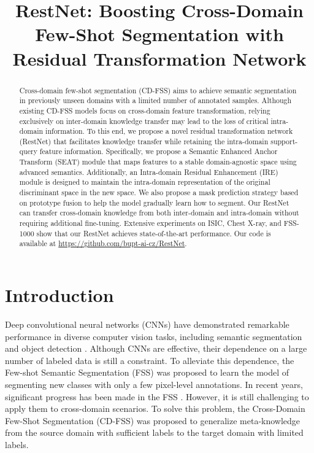 \documentclass{bmvc2k}
\title{RestNet: Boosting Cross-Domain Few-Shot Segmentation with Residual Transformation Network}
\begin{document}
\maketitle


\begin{abstract}
Cross-domain few-shot segmentation (CD-FSS) aims to achieve semantic segmentation in previously unseen domains with a limited number of annotated samples.
Although existing CD-FSS models focus on cross-domain feature transformation, relying exclusively on inter-domain knowledge transfer may lead to the loss of critical intra-domain information.
To this end, we propose a novel residual transformation network (RestNet) that facilitates knowledge transfer while retaining the intra-domain support-query feature information.
Specifically, we propose a Semantic Enhanced Anchor Transform (SEAT) module that maps features to a stable domain-agnostic space using advanced semantics. 
Additionally, an Intra-domain Residual Enhancement (IRE) module is designed to maintain the intra-domain representation of the original discriminant space in the new space.
We also propose a mask prediction strategy based on prototype fusion to help the model gradually learn how to segment.
Our RestNet can transfer cross-domain knowledge from both inter-domain and intra-domain without requiring additional fine-tuning. 
Extensive experiments on ISIC, Chest X-ray, and FSS-1000 show that our RestNet achieves state-of-the-art performance.
Our code is available at \url{https://github.com/bupt-ai-cz/RestNet}.
\end{abstract}
\section{Introduction}
Deep convolutional neural networks (CNNs) have demonstrated remarkable performance in diverse computer vision tasks, including semantic segmentation \cite{long2015fully, zhao2017pyramid, ronneberger2015u} and object detection \cite{dai2017deformable, he2017mask, redmon2016you}.
Although CNNs are effective, their dependence on a large number of labeled data is still a constraint.
To alleviate this dependence, the Few-shot Semantic Segmentation (FSS) \cite{shaban2017one} was proposed to learn the model of segmenting new classes with only a few pixel-level annotations.
In recent years, significant progress has been made in the FSS \cite{zhang2019canet, wang2019panet, siam2019amp, zhang2019pyramid, okazawa2022interclass, liu2020crnet, tian2020prior, min2021hypercorrelation, boudiaf2021few, Liu_2022_BMVC}. 
However, it is still challenging to apply them to cross-domain scenarios. 
To solve this problem, the Cross-Domain Few-Shot Segmentation (CD-FSS) was proposed \cite{lei2022cross} to generalize meta-knowledge from the source domain with sufficient labels to the target domain with limited labels.
\end{document}
